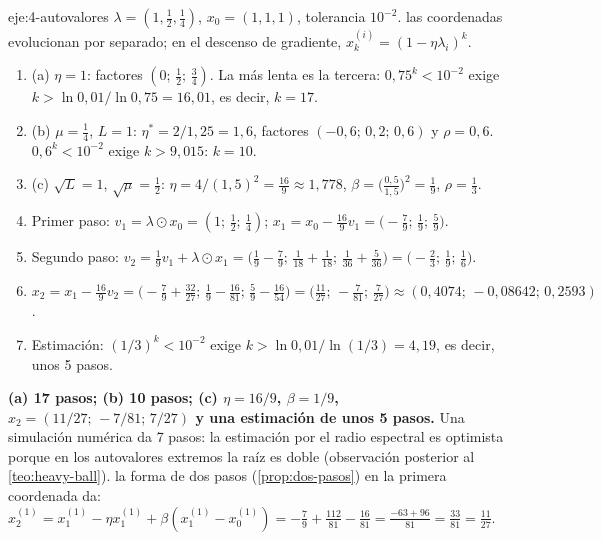 \begin{solucion}{eje:4-autovalores}
\datos $\lambda=(1,\frac12,\frac14)$, $x_0=(1,1,1)$, tolerancia $10^{-2}$.
\planteamiento las coordenadas evolucionan por separado; en el descenso de gradiente, $x_k^{(i)}=(1-\eta\lambda_i)^{k}$.
\pasos
\begin{enumerate}[label=\arabic*.]
  \item (a) $\eta=1$: factores $(0;\,\frac12;\,\frac34)$. La más lenta es la tercera: $0{,}75^{k}<10^{-2}$ exige $k>\ln 0{,}01/\ln 0{,}75=16{,}01$, es decir, $k=17$.
  \item (b) $\mu=\frac14$, $L=1$: $\eta^{\ast}=2/1{,}25=1{,}6$, factores $(-0{,}6;\,0{,}2;\,0{,}6)$ y $\rho=0{,}6$. $0{,}6^{k}<10^{-2}$ exige $k>9{,}015$: $k=10$.
  \item (c) $\sqrt L=1$, $\sqrt\mu=\frac12$: $\eta=4/(1{,}5)^{2}=\frac{16}{9}\approx 1{,}778$, $\beta=\bigl(\frac{0{,}5}{1{,}5}\bigr)^{2}=\frac19$, $\rho=\frac13$.
  \item Primer paso: $v_1=\lambda\odot x_0=(1;\,\frac12;\,\frac14)$; $x_1=x_0-\frac{16}{9}v_1=\bigl(-\frac79;\,\frac19;\,\frac59\bigr)$.
  \item Segundo paso: $v_2=\frac19v_1+\lambda\odot x_1=\bigl(\frac19-\frac79;\,\frac{1}{18}+\frac{1}{18};\,\frac{1}{36}+\frac{5}{36}\bigr)=\bigl(-\frac23;\,\frac19;\,\frac16\bigr)$.
  \item $x_2=x_1-\frac{16}{9}v_2=\bigl(-\frac79+\frac{32}{27};\,\frac19-\frac{16}{81};\,\frac59-\frac{16}{54}\bigr)=\bigl(\frac{11}{27};\,-\frac{7}{81};\,\frac{7}{27}\bigr)\approx(0{,}4074;\,-0{,}08642;\,0{,}2593)$.
  \item Estimación: $(1/3)^{k}<10^{-2}$ exige $k>\ln 0{,}01/\ln(1/3)=4{,}19$, es decir, unos 5 pasos.
\end{enumerate}
\resultado \textbf{(a) 17 pasos; (b) 10 pasos; (c) $\eta=16/9$, $\beta=1/9$, $x_2=(11/27;\,-7/81;\,7/27)$ y una estimación de unos 5 pasos.} Una simulación numérica da 7 pasos: la estimación por el radio espectral es optimista porque en los autovalores extremos la raíz es doble (observación posterior al \cref{teo:heavy-ball}).
\comprobacion la forma de dos pasos (\cref{prop:dos-pasos}) en la primera coordenada da: $x_2^{(1)}=x_1^{(1)}-\eta x_1^{(1)}+\beta(x_1^{(1)}-x_0^{(1)})=-\frac79+\frac{112}{81}-\frac{16}{81}=\frac{-63+96}{81}=\frac{33}{81}=\frac{11}{27}$.
\end{solucion}

